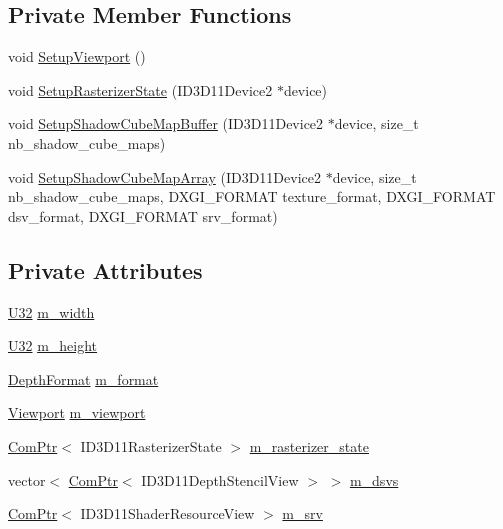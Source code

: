 \subsection*{Private Member Functions}
\begin{DoxyCompactItemize}
\item 
void \hyperlink{structmage_1_1_shadow_cube_map_buffer_a612f25e151e575a7266b41ddb6a072cf}{Setup\+Viewport} ()
\item 
void \hyperlink{structmage_1_1_shadow_cube_map_buffer_af4cb16c81f8a1fdeb0647dda0e7bc258}{Setup\+Rasterizer\+State} (I\+D3\+D11\+Device2 $\ast$device)
\item 
void \hyperlink{structmage_1_1_shadow_cube_map_buffer_acbdfc3eaf61ba5b4638033b804f90e86}{Setup\+Shadow\+Cube\+Map\+Buffer} (I\+D3\+D11\+Device2 $\ast$device, size\+\_\+t nb\+\_\+shadow\+\_\+cube\+\_\+maps)
\item 
void \hyperlink{structmage_1_1_shadow_cube_map_buffer_a583020f593e4a02f6eda0103f56042bd}{Setup\+Shadow\+Cube\+Map\+Array} (I\+D3\+D11\+Device2 $\ast$device, size\+\_\+t nb\+\_\+shadow\+\_\+cube\+\_\+maps, D\+X\+G\+I\+\_\+\+F\+O\+R\+M\+AT texture\+\_\+format, D\+X\+G\+I\+\_\+\+F\+O\+R\+M\+AT dsv\+\_\+format, D\+X\+G\+I\+\_\+\+F\+O\+R\+M\+AT srv\+\_\+format)
\end{DoxyCompactItemize}
\subsection*{Private Attributes}
\begin{DoxyCompactItemize}
\item 
\hyperlink{namespacemage_a41c104c036fba3756a74e19f793eeaa1}{U32} \hyperlink{structmage_1_1_shadow_cube_map_buffer_a9492f3ff2146a03d30f3f02fd7985aba}{m\+\_\+width}
\item 
\hyperlink{namespacemage_a41c104c036fba3756a74e19f793eeaa1}{U32} \hyperlink{structmage_1_1_shadow_cube_map_buffer_ac20a53ecc1ec9a00a2241f8c8a3405e6}{m\+\_\+height}
\item 
\hyperlink{namespacemage_aed4c3f883a30484d0a20762c06be81d4}{Depth\+Format} \hyperlink{structmage_1_1_shadow_cube_map_buffer_ada9a7c895a74303904f9884b986c935f}{m\+\_\+format}
\item 
\hyperlink{classmage_1_1_viewport}{Viewport} \hyperlink{structmage_1_1_shadow_cube_map_buffer_aac92648e1af47ffdf99575cdaab0485e}{m\+\_\+viewport}
\item 
\hyperlink{namespacemage_ae74f374780900893caa5555d1031fd79}{Com\+Ptr}$<$ I\+D3\+D11\+Rasterizer\+State $>$ \hyperlink{structmage_1_1_shadow_cube_map_buffer_a72ffa7fc89386a954b33fac38a894f2c}{m\+\_\+rasterizer\+\_\+state}
\item 
vector$<$ \hyperlink{namespacemage_ae74f374780900893caa5555d1031fd79}{Com\+Ptr}$<$ I\+D3\+D11\+Depth\+Stencil\+View $>$ $>$ \hyperlink{structmage_1_1_shadow_cube_map_buffer_aa0db6bec24d63c39c85400c4328190fc}{m\+\_\+dsvs}
\item 
\hyperlink{namespacemage_ae74f374780900893caa5555d1031fd79}{Com\+Ptr}$<$ I\+D3\+D11\+Shader\+Resource\+View $>$ \hyperlink{structmage_1_1_shadow_cube_map_buffer_a16738a534aca6de39aec687bc79ede1c}{m\+\_\+srv}
\end{DoxyCompactItemize}


